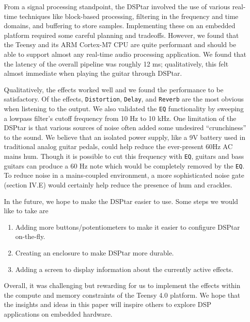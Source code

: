 \documentclass[conference]{IEEEtran}
\begin{document}
From a signal processing standpoint, the DSPtar involved the use of various real-time techniques like block-based processing, filtering in the frequency and time domains, and buffering to store samples. Implementing these on an embedded platform required some careful planning and tradeoffs. However, we found that the Teensy and its ARM Cortex-M7 CPU are quite performant and should be able to support almost any real-time audio processing application. We found that the latency of the overall pipeline was roughly 12 ms; qualitatively, this felt almost immediate when playing the guitar through DSPtar.

Qualitatively, the effects worked well and we found the performance to be satisfactory. Of the effects, \texttt{Distortion}, \texttt{Delay}, and \texttt{Reverb} are the most obvious when listening to the output. We also validated the \texttt{EQ} functionality by sweeping a lowpass filter's cutoff frequency from 10 Hz to 10 kHz. One limitation of the DSPtar is that various sources of noise often added some undesired ``crunchiness'' to the sound. We believe that an isolated power supply, like a 9V battery used in traditional analog guitar pedals, could help reduce the ever-present 60Hz AC mains hum. Though it is possible to cut this frequency with \texttt{EQ}, guitars and bass guitars can produce a 60 Hz note which would be completely removed by the \texttt{EQ}. To reduce noise in a mains-coupled environment, a more sophisticated noise gate (section IV.E) would certainly help reduce the presence of hum and crackles.

In the future, we hope to make the DSPtar easier to use. Some steps we would like to take are 

\begin{enumerate}
    \item Adding more buttons/potentiometers to make it easier to configure DSPtar on-the-fly.
    \item Creating an enclosure to make DSPtar more durable.
    \item Adding a screen to display information about the currently active effects.
\end{enumerate}

Overall, it was challenging but rewarding for us to implement the effects within the compute and memory constraints of the Teensy 4.0 platform. We hope that the insights and ideas in this paper will inspire others to explore DSP applications on embedded hardware.
\end{document}
